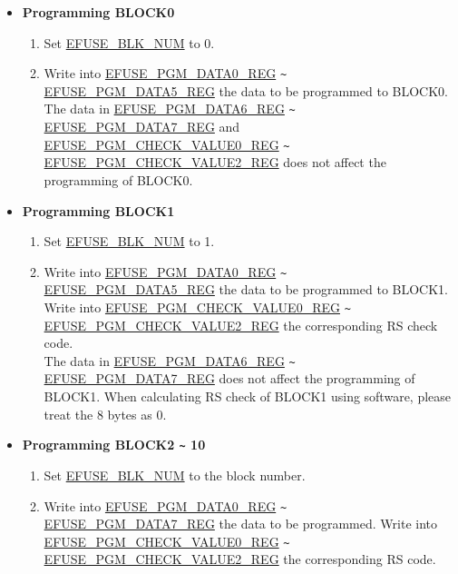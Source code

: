 \documentclass[main\_\_EN.tex]{subfiles}
\begin{document}
\begin{itemize}
    \item {\bfseries Programming BLOCK0}
    \begin{enumerate}
        \item Set \hyperref[fielddesc:EFUSEBLKNUM]{EFUSE\_BLK\_NUM} to 0.
        \item Write into \hyperref[regdesc:EFUSEPGMDATA0REG]{EFUSE\_PGM\_DATA0\_REG} \verb+~+ \hyperref[regdesc:EFUSEPGMDATA1REG]{EFUSE\_PGM\_DATA5\_REG} the data to be programmed to BLOCK0. \\
        The data in \hyperref[regdesc:EFUSEPGMDATA6REG]{EFUSE\_PGM\_DATA6\_REG} \verb+~+ \hyperref[regdesc:EFUSEPGMDATA7REG]{EFUSE\_PGM\_DATA7\_REG} and \hyperref[regdesc:EFUSEPGMCHECKVALUE0REG]{EFUSE\_PGM\_CHECK\_VALUE0\_REG} \verb+~+ \hyperref[regdesc:EFUSEPGMCHECKVALUE2REG]{EFUSE\_PGM\_CHECK\_VALUE2\_REG} does not affect the programming of BLOCK0.
    \end{enumerate}
    \item {\bfseries Programming BLOCK1}
    \begin{enumerate}
        \item Set \hyperref[fielddesc:EFUSEBLKNUM]{EFUSE\_BLK\_NUM} to 1.
        \item Write into \hyperref[regdesc:EFUSEPGMDATA0REG]{EFUSE\_PGM\_DATA0\_REG} \verb+~+ \hyperref[regdesc:EFUSEPGMDATA5REG]{EFUSE\_PGM\_DATA5\_REG} the data to be programmed to BLOCK1. Write into \hyperref[regdesc:EFUSEPGMCHECKVALUE0REG]{EFUSE\_PGM\_CHECK\_VALUE0\_REG} \verb+~+ \hyperref[regdesc:EFUSEPGMCHECKVALUE2REG]{EFUSE\_PGM\_CHECK\_VALUE2\_REG} the corresponding RS check code.\\
        The data in \hyperref[regdesc:EFUSEPGMDATA0REG]{EFUSE\_PGM\_DATA6\_REG} \verb+~+ \hyperref[regdesc:EFUSEPGMDATA5REG]{EFUSE\_PGM\_DATA7\_REG} does not affect the programming of BLOCK1. When calculating RS check of BLOCK1 using software, please treat the 8 bytes as 0.
    \end{enumerate}
    \item {\bfseries Programming BLOCK2 \verb+~+ 10}
    \begin{enumerate}
        \item Set \hyperref[fielddesc:EFUSEBLKNUM]{EFUSE\_BLK\_NUM} to the block number.
        \item Write into \hyperref[regdesc:EFUSEPGMDATA0REG]{EFUSE\_PGM\_DATA0\_REG} \verb+~+ \hyperref[regdesc:EFUSEPGMDATA7REG]{EFUSE\_PGM\_DATA7\_REG} the data to be programmed. Write into \hyperref[regdesc:EFUSEPGMCHECKVALUE0REG]{EFUSE\_PGM\_CHECK\_VALUE0\_REG}  \verb+~+ \hyperref[regdesc:EFUSEPGMCHECKVALUE2REG]{EFUSE\_PGM\_CHECK\_VALUE2\_REG} the corresponding RS code.
    \end{enumerate}
\end{itemize}
\end{document}
